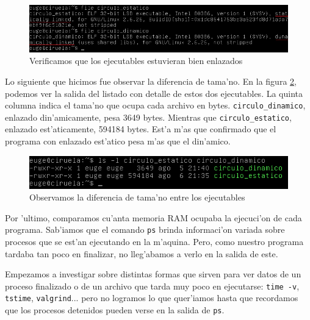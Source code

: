 \documentclass[11pt]{article}
\begin{document}
		\begin{figure}[H]
    			\centering
    			\includegraphics[scale=0.65]{Images/Seccion 1/bien_enlazados_.png}
    			\caption{Verificamos que los ejecutables estuvieran bien enlazados}
    			\label{fig:bien_enlazados}
		\end{figure}
 
		Lo siguiente que hicimos fue observar la diferencia de tama'no. En la figura \ref{fig:bytes_circulos}, podemos ver la salida del listado con detalle de estos dos ejecutables. La quinta columna indica el tama'no que ocupa cada archivo en bytes. \texttt{circulo\_dinamico}, enlazado din'amicamente, pesa 3649 bytes. Mientras que \texttt{circulo\_estatico}, enlazado est'aticamente, 594184 bytes. Est'a m'as que confirmado que el programa con enlazado est'atico pesa m'as que el din'amico.


		\begin{figure}[H]
    			\centering
    			\includegraphics[scale=0.8]{Images/Seccion 1/bytes_circulos.png}
    			\caption{Observamos la diferencia de tama'no entre los ejecutables}
    			\label{fig:bytes_circulos}
		\end{figure}

		Por 'ultimo, comparamos cu'anta memoria RAM ocupaba la ejecuci'on de cada programa. Sab'iamos que el comando \texttt{ps} %
		brinda informaci'on variada sobre procesos que se est'an ejecutando en la m'aquina. Pero, como nuestro programa tardaba tan poco en finalizar, no lleg'abamos a verlo en la salida de este.

		Empezamos a investigar sobre distintas formas que sirven para ver datos de un proceso finalizado o de un archivo que tarda muy poco en ejecutarse: \texttt{time -v}, \texttt{tstime}, \texttt{valgrind}... pero no logramos lo que quer'iamos hasta que recordamos que los procesos detenidos pueden verse en la salida de \texttt{ps}.
\end{document}
